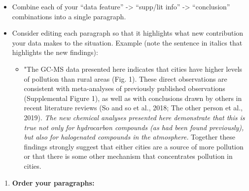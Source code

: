\documentclass[
]{krantz}
\providecommand{\tightlist}{%
  \setlength{\itemsep}{0pt}\setlength{\parskip}{0pt}}
\begin{document}
\begin{itemize}
\tightlist
\item
  Combine each of your ``data feature'' -\textgreater{} ``supp/lit info'' -\textgreater{} ``conclusion'' combinations into a single paragraph.
\item
  Consider editing each paragraph so that it highlights what new contribution your data makes to the situation. Example (note the sentence in italics that highlights the new findings):

  \begin{itemize}
  \tightlist
  \item
    "The GC-MS data presented here indicates that cities have higher levels of pollution than rural areas (Fig. 1). These direct observations are consistent with meta-analyses of previously published observations (Supplemental Figure 1), as well as with conclusions drawn by others in recent literature reviews (So and so et al., 2018; The other person et al., 2019). \emph{The new chemical analyses presented here demonstrate that this is true not only for hydrocarbon compounds (as had been found previously), but also for halogenated compounds in the atmosphere.} Together these findings strongly suggest that either cities are a source of more pollution or that there is some other mechanism that concentrates pollution in cities.
  \end{itemize}
\end{itemize}

\begin{enumerate}
\def\labelenumi{\arabic{enumi}.}
\setcounter{enumi}{2}
\tightlist
\item
  \textbf{Order your paragraphs:}
\end{enumerate}
\end{document}
